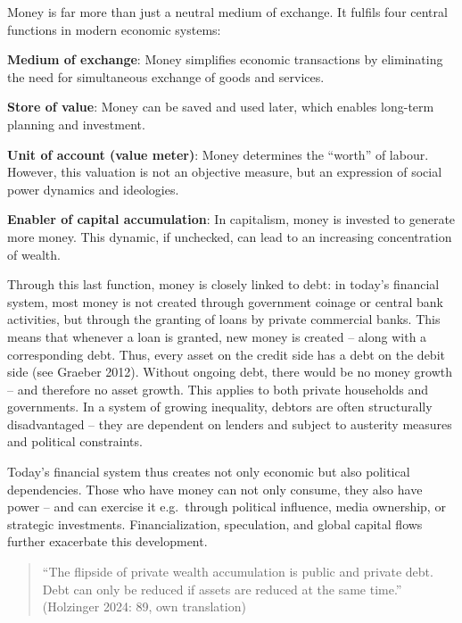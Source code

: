 \documentclass[
  a4paper,
  openany]{book}
\begin{document}
\begin{tcolorbox}[enhanced jigsaw, left=2mm, arc=.35mm, titlerule=0mm, opacityback=0, leftrule=.75mm, title={What we need to understand about money and debt}, breakable, bottomtitle=1mm, rightrule=.15mm, coltitle=black, toptitle=1mm, bottomrule=.15mm, colback=white, opacitybacktitle=0.6, colbacktitle=quarto-callout-note-color!10!white, toprule=.15mm, colframe=quarto-callout-note-color-frame]

Money is far more than just a neutral medium of exchange. It fulfils
four central functions in modern economic systems:

\textbf{Medium of exchange}: Money simplifies economic transactions by
eliminating the need for simultaneous exchange of goods and services.

\textbf{Store of value}: Money can be saved and used later, which
enables long-term planning and investment.

\textbf{Unit of account (value meter)}: Money determines the ``worth''
of labour. However, this valuation is not an objective measure, but an
expression of social power dynamics and ideologies.

\textbf{Enabler of capital accumulation}: In capitalism, money is
invested to generate more money. This dynamic, if unchecked, can lead to
an increasing concentration of wealth.

Through this last function, money is closely linked to debt: in today's
financial system, most money is not created through government coinage
or central bank activities, but through the granting of loans by private
commercial banks. This means that whenever a loan is granted, new money
is created -- along with a corresponding debt. Thus, every asset on the
credit side has a debt on the debit side (see Graeber 2012). Without
ongoing debt, there would be no money growth -- and therefore no asset
growth. This applies to both private households and governments. In a
system of growing inequality, debtors are often structurally
disadvantaged -- they are dependent on lenders and subject to austerity
measures and political constraints.

Today's financial system thus creates not only economic but also
political dependencies. Those who have money can not only consume, they
also have power -- and can exercise it e.g.~through political influence,
media ownership, or strategic investments. Financialization,
speculation, and global capital flows further exacerbate this
development.

\begin{quote}
``The flipside of private wealth accumulation is public and private
debt. Debt can only be reduced if assets are reduced at the same time.''
(Holzinger 2024: 89, own translation)
\end{quote}

\end{tcolorbox}
\end{document}
